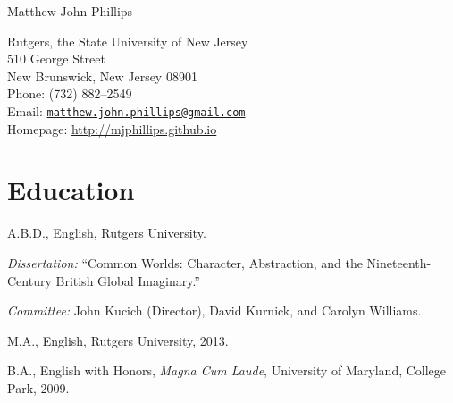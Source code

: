 \documentclass[10pt,letterpaper]{article}
\def\name{Matthew John Phillips}
\renewenvironment{itemize}{
  \begin{list}{}{
    \setlength{\leftmargin}{1.5em}
    \setlength{\itemsep}{0.25em}
    \setlength{\parskip}{0pt}
    \setlength{\parsep}{0.25em}
  }
}{
  \end{list}
}
\begin{document}
	\raggedright

{\huge \name}


\bigskip

\begin{minipage}[t]{0.495\textwidth}
  Rutgers, the State University of New Jersey \\
  510 George Street \\
  New Brunswick, New Jersey 08901 \\
    Phone: (732) 882--2549 \\
Email: \texttt{\href{mailto:matthew.john.phillips@gmail.com}{matthew.john.phillips@gmail.com}} \\
Homepage: \href{http://mjphillips.github.io}{http://mjphillips.github.io}
\end{minipage}


\section*{Education}

\begin{itemize}
  \item A.B.D., English, Rutgers University.
    \begin{itemize}
    \item \emph{Dissertation:} ``Common Worlds: Character, Abstraction, and the Nineteenth-Century British Global Imaginary.''
    \item \emph{Committee:} John Kucich (Director), David Kurnick, and Carolyn Williams.
    \end{itemize}
  \item M.A., English, Rutgers University, 2013.
  \item B.A., English with Honors, \textit{Magna Cum Laude},
    University of Maryland, College Park, 2009.
\end{itemize}

\end{document}
